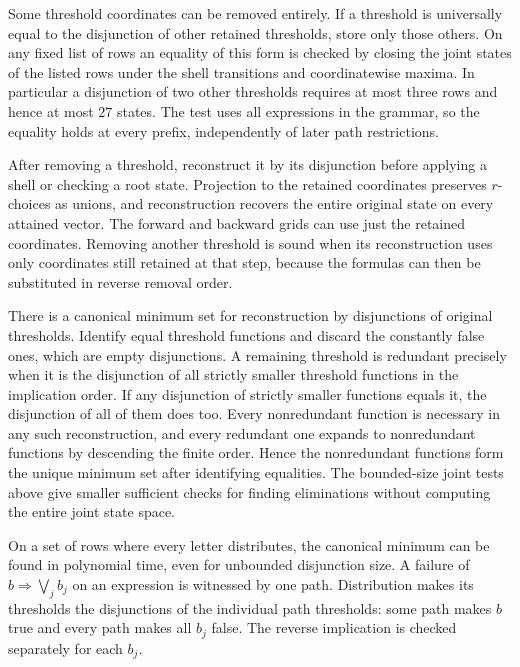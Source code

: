 Some threshold coordinates can be removed entirely.
If a threshold is universally equal to the disjunction
of other retained thresholds, store only those others.
On any fixed list of rows an equality of this form is
checked by closing the joint states of the listed rows
under the shell transitions and coordinatewise maxima.
In particular a disjunction of two other thresholds
requires at most three rows and hence at most $27$
states. The test uses all expressions in the grammar,
so the equality holds at every prefix, independently
of later path restrictions.

After removing a threshold, reconstruct it by its
disjunction before applying a shell or checking a
root state. Projection to the retained coordinates
preserves $r$-choices as unions, and reconstruction
recovers the entire original state on every attained
vector. The forward and backward grids can use just
the retained coordinates. Removing another threshold
is sound when its reconstruction uses only coordinates
still retained at that step, because the formulas can
then be substituted in reverse removal order.

There is a canonical minimum set for reconstruction
by disjunctions of original thresholds. Identify equal
threshold functions and discard the constantly false
ones, which are empty disjunctions. A remaining
threshold is redundant precisely when it is the
disjunction of all strictly smaller threshold functions
in the implication order. If any disjunction of
strictly smaller functions equals it, the disjunction
of all of them does too. Every nonredundant function
is necessary in any such reconstruction, and every
redundant one expands to nonredundant functions by
descending the finite order. Hence the nonredundant
functions form the unique minimum set after identifying
equalities. The bounded-size joint tests above give
smaller sufficient checks for finding eliminations
without computing the entire joint state space.

On a set of rows where every letter distributes, the
canonical minimum can be found in polynomial time,
even for unbounded disjunction size. A failure of
$b\Rightarrow\bigvee_j b_j$ on an expression is
witnessed by one path. Distribution makes its
thresholds the disjunctions of the individual path
thresholds: some path makes $b$ true and every path
makes all $b_j$ false. The reverse implication is
checked separately for each $b_j$.

